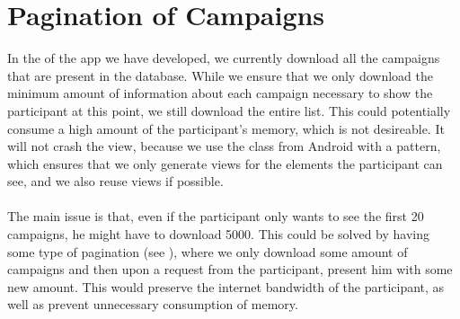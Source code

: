 
\section{Pagination of Campaigns}
\label{sec:pagination_of_campaigns}

In the  of the app we have developed, we currently download all the campaigns that are present in the database. While we ensure that we only download the minimum amount of information about each campaign necessary to show the participant at this point, we still download the entire list. This could potentially consume a high amount of the participant's memory, which is not desireable. It will not crash the view, because we use the  class from Android with a  pattern, which ensures that we only generate views for the elements the participant can see, and we also reuse views if possible.
\\\\
The main issue is that, even if the participant only wants to see the first 20 campaigns, he might have to download 5000. This could be solved by having some type of pagination (see ), where we only download some amount of campaigns and then upon a request from the participant, present him with some new amount. This would preserve the internet bandwidth of the participant, as well as prevent unnecessary consumption of memory.